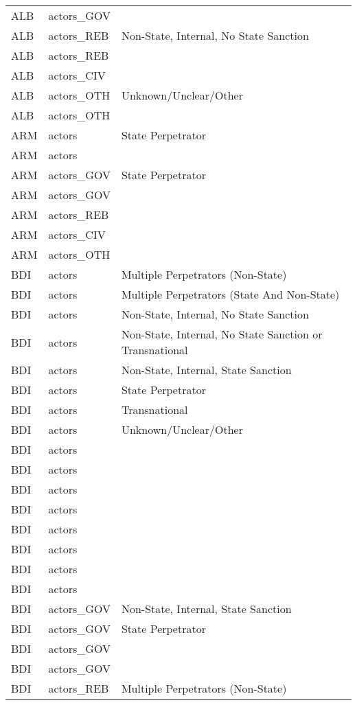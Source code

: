 \begin{table}[ht]
\begin{tabular}{lll}
  ALB & actors\_GOV &  \\ 
  ALB & actors\_REB & Non-State, Internal, No State Sanction \\ 
  ALB & actors\_REB &  \\ 
  ALB & actors\_CIV &  \\ 
  ALB & actors\_OTH & Unknown/Unclear/Other \\ 
  ALB & actors\_OTH &  \\ 
  ARM & actors & State Perpetrator \\ 
  ARM & actors &  \\ 
  ARM & actors\_GOV & State Perpetrator \\ 
  ARM & actors\_GOV &  \\ 
  ARM & actors\_REB &  \\ 
  ARM & actors\_CIV &  \\ 
  ARM & actors\_OTH &  \\ 
  BDI & actors & Multiple Perpetrators (Non-State) \\ 
  BDI & actors & Multiple Perpetrators (State And Non-State) \\ 
  BDI & actors & Non-State, Internal, No State Sanction \\ 
  BDI & actors & Non-State, Internal, No State Sanction or Transnational \\ 
  BDI & actors & Non-State, Internal, State Sanction \\ 
  BDI & actors & State Perpetrator \\ 
  BDI & actors & Transnational \\ 
  BDI & actors & Unknown/Unclear/Other \\ 
  BDI & actors &  \\ 
  BDI & actors &  \\ 
  BDI & actors &  \\ 
  BDI & actors &  \\ 
  BDI & actors &  \\ 
  BDI & actors &  \\ 
  BDI & actors &  \\ 
  BDI & actors &  \\ 
  BDI & actors\_GOV & Non-State, Internal, State Sanction \\ 
  BDI & actors\_GOV & State Perpetrator \\ 
  BDI & actors\_GOV &  \\ 
  BDI & actors\_GOV &  \\ 
  BDI & actors\_REB & Multiple Perpetrators (Non-State) \\ 

\end{tabular}
\end{table}
